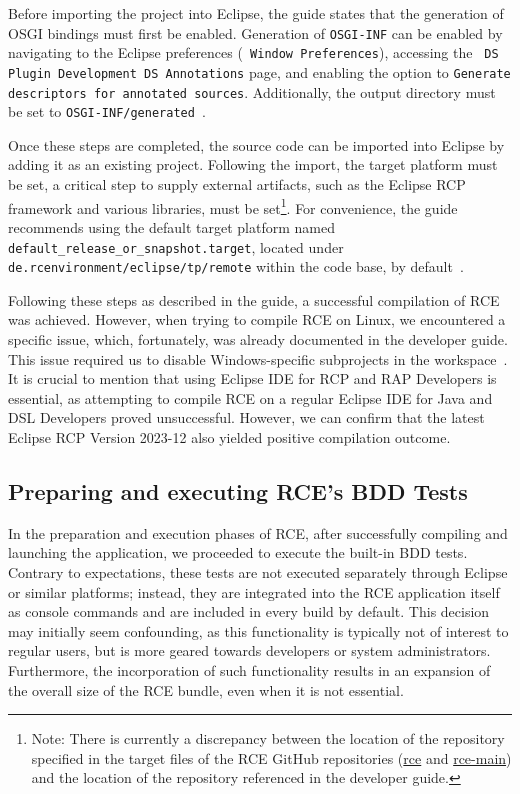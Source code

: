 Before importing the project into Eclipse, the guide states that the generation of OSGI bindings must first be enabled. Generation of \texttt{OSGI-INF} can be enabled by navigating to the Eclipse preferences (\texttt{ Window Preferences}), accessing the \texttt{ DS Plugin Development DS Annotations} page, and enabling the option to \texttt{Generate descriptors for annotated sources}. Additionally, the output directory must be set to \texttt{OSGI-INF/generated}~\cite{rceDevGuide10x}.

Once these steps are completed, the source code can be imported into Eclipse by adding it as an existing project. Following the import, the target platform must be set, a critical step to supply external artifacts, such as the Eclipse RCP framework and various libraries, must be set\footnote{Note: There is currently a discrepancy between the location of the repository specified in the target files of the RCE GitHub repositories (\href{https://github.com/rcenvironment/rce/blob/master/de.rcenvironment/eclipse/tp/remote/default_release_or_snapshot.target}{rce} and \href{https://github.com/rcenvironment/rce-main/blob/main/de.rcenvironment/eclipse/tp/remote/default_release_or_snapshot.target}{rce-main}) and the location of the repository referenced in the developer guide.}. For convenience, the guide recommends using the default target platform named \texttt{default\_release\_or\_snapshot.target}, located under \texttt{de.rcenvironment/eclipse/tp/remote} within the code base, by default~\cite{rceDevGuide10x}.

Following these steps as described in the guide, a successful compilation of \ac{RCE} was achieved. However, when trying to compile \ac{RCE} on Linux, we encountered a specific issue, which, fortunately, was already documented in the developer guide. This issue required us to disable Windows-specific subprojects in the workspace~\cite{rceDevGuide10x}. It is crucial to mention that using Eclipse IDE for RCP and RAP Developers is essential, as attempting to compile \ac{RCE} on a regular Eclipse IDE for Java and DSL Developers proved unsuccessful. However, we can confirm that the latest Eclipse RCP Version 2023-12 also yielded positive compilation outcome.

\subsection{Preparing and executing \ac{RCE}'s BDD Tests}
\label{subsec:PreparingRCETests}
In the preparation and execution phases of \ac{RCE}, after successfully compiling and launching the application, we proceeded to execute the built-in BDD tests. Contrary to expectations, these tests are not executed separately through Eclipse or similar platforms; instead, they are integrated into the \ac{RCE} application itself as console commands and are included in every build by default. This decision may initially seem confounding, as this functionality is typically not of interest to regular users, but is more geared towards developers or system administrators. Furthermore, the incorporation of such functionality results in an expansion of the overall size of the \ac{RCE} bundle, even when it is not essential. 

